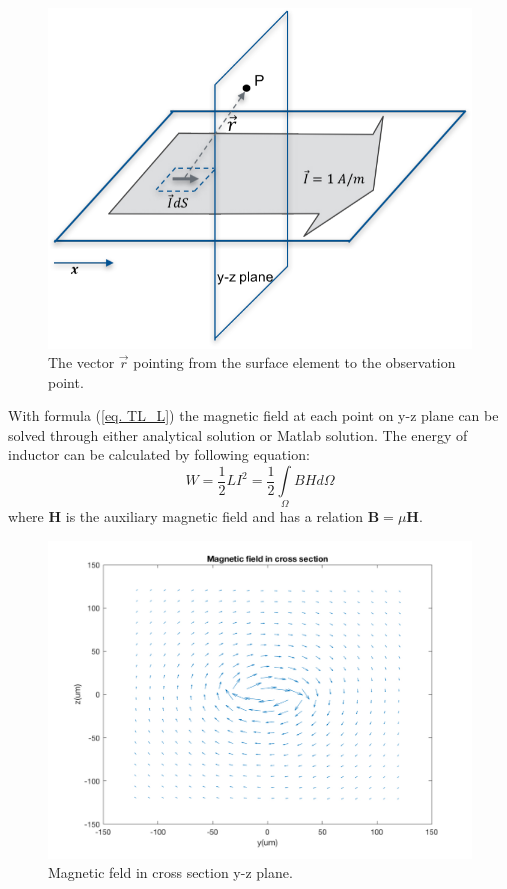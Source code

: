 \documentclass[11pt,final]{scrbook}
\begin{document}
 \begin{figure}[htbp]
\begin{center}
\includegraphics[scale=0.9]{images/TL_L(2).pdf}
\caption{The vector $\vec{ r } $ pointing from the surface element to the observation point.}
\label{fig:TL_L(2)}
\end{center}
\end{figure}

With formula (\ref{eq. TL_L}) the magnetic field at each point on y-z plane can be solved through either analytical solution or Matlab solution. The energy of inductor can be calculated by following equation:
\begin{equation}
  W=\frac{1}{2}LI^{2}=\frac{1}{2}\underset { \Omega  }{\int }{ B H  } d\Omega
 \end{equation} 
 where $\textbf{H}$ is the auxiliary magnetic field and has a relation $\textbf{B}=\mu \textbf{H}$.

\begin{figure}[htbp]
\begin{center}
\includegraphics[scale=0.3]{images/TL_L.pdf}
\caption{Magnetic feld in cross section y-z plane.}
\label{fig:TL_L}
\end{center}
\end{figure}
\end{document}
